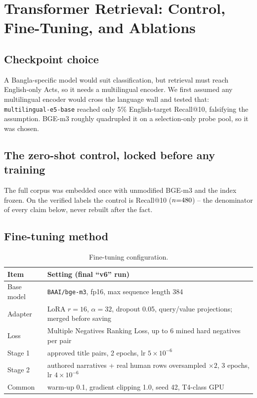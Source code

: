 \documentclass[10pt,a4paper]{article}
\begin{document}
\section{Transformer Retrieval: Control, Fine-Tuning, and Ablations}

\subsection{Checkpoint choice}
A Bangla-specific model would suit classification, but retrieval must reach English-only Acts, so it needs a multilingual encoder. We first assumed any multilingual encoder would cross the language wall and tested that: \texttt{multilingual-e5-base} reached only 5\% English-target Recall@10, falsifying the assumption. BGE-m3 roughly quadrupled it on a selection-only probe pool, so it was chosen.

\subsection{The zero-shot control, locked before any training}
The full corpus was embedded once with unmodified BGE-m3 and the index frozen. On the verified labels the control is \RtenZsLadder{} Recall@10 ($n{=}480$) -- the denominator of every claim below, never rebuilt after the fact.

\subsection{Fine-tuning method}
\begin{table}[H]
\centering\small
\begin{tabular}{@{}p{3.6cm}p{9.8cm}@{}}
\toprule
\textbf{Item} & \textbf{Setting (final ``v6'' run)}\\
\midrule
Base model & \texttt{BAAI/bge-m3}, fp16, max sequence length 384\\
Adapter & LoRA $r{=}16$, $\alpha{=}32$, dropout 0.05, query/value projections; merged before saving\\
Loss & Multiple Negatives Ranking Loss, up to 6 mined hard negatives per pair\\
Stage 1 & approved title pairs, 2 epochs, lr $5{\times}10^{-6}$\\
Stage 2 & authored narratives + real human rows oversampled $\times2$, 3 epochs, lr $4{\times}10^{-6}$\\
Common & warm-up 0.1, gradient clipping 1.0, seed 42, T4-class GPU\\
\bottomrule
\end{tabular}
\caption{Fine-tuning configuration.}
\end{table}
\end{document}
